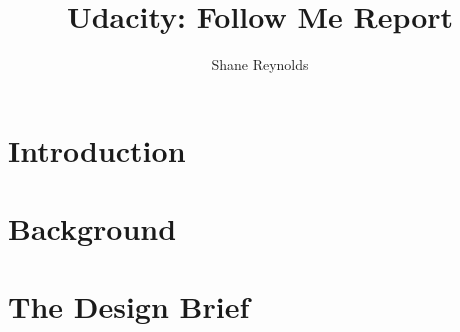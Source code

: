 \documentclass[a4paper]{article}
\begin{document}
\title{Udacity: Follow Me Report}
\author{Shane Reynolds}
\maketitle
\section{Introduction}


\section{Background}


\section{The Design Brief}
\end{document}
